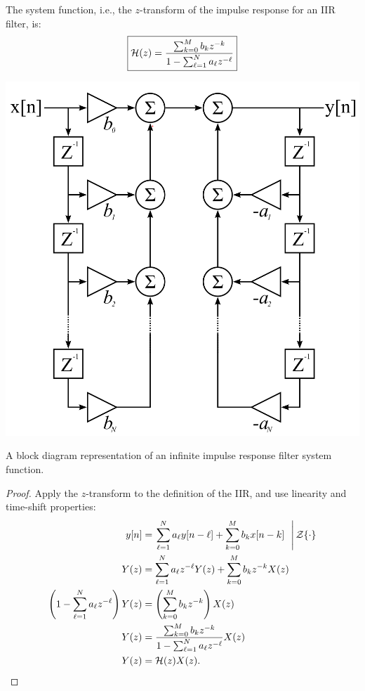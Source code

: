 The system function, i.e., the $z$-transform of the impulse response for an IIR filter, is:
\begin{equation}
    \boxed{
        \mathcal{H}(z) = \frac{\sum_{k=0}^{M}b_k z^{-k}}{1-\sum_{\ell=1}^{N}a_\ell z^{-\ell}}
        \label{eq:iir_system_gen}
    }
\end{equation}

\begin{marginfigure}
    \begin{center}
        \includegraphics[width=\textwidth]{ch19/figures/iir.png}
    \end{center}
    \caption{A block diagram representation of an infinite impulse response filter system function.}
    \label{fig:iireq}
\end{marginfigure}

\begin{proof}
    Apply the $z$-transform to the definition of the IIR, and use linearity and time-shift properties:
    \begin{align}
        y[n]                                                   & = \left.\sum_{\ell=1}^{N} a_{\ell} y[n-\ell] + \sum_{k=0}^{M} b_k x[n-k]~~\right| \mathcal{Z}\{ \cdot \} \\
        Y(z)                                                   & = \sum_{\ell = 1}^{N} a_{\ell} z^{-\ell} Y(z) + \sum_{k=0}^{M} b_k z^{-k} X(z)                           \\
        \left(1-\sum_{\ell=1}^{N} a_\ell z^{-\ell}\right) Y(z) & = \left(\sum_{k=0}^{M} b_k z^{-k}\right)X(z)                                                             \\
        Y(z)                                                   & = \frac{\sum_{k=0}^{M}b_k z^{-k}}{1-\sum_{\ell=1}^{N}a_\ell z^{-\ell}} X(z)                              \\
        Y(z)                                                   & = \mathcal{H}(z) X(z).
    \end{align}
\end{proof}

